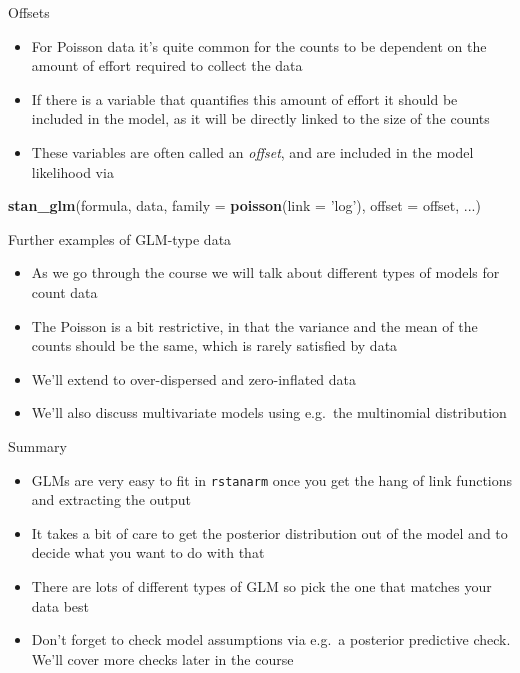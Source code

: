\documentclass[ignorenonframetext,]{beamer}
\newenvironment{Shaded}{\begin{snugshade}}{\end{snugshade}}
\newcommand{\KeywordTok}[1]{\textcolor[rgb]{0.13,0.29,0.53}{\textbf{#1}}}
\newcommand{\DataTypeTok}[1]{\textcolor[rgb]{0.13,0.29,0.53}{#1}}
\newcommand{\StringTok}[1]{\textcolor[rgb]{0.31,0.60,0.02}{#1}}
\newcommand{\NormalTok}[1]{#1}
\providecommand{\tightlist}{%
  \setlength{\itemsep}{0pt}\setlength{\parskip}{0pt}}
\begin{document}
\begin{frame}[fragile]{Offsets}

\begin{itemize}
\tightlist
\item
  For Poisson data it's quite common for the counts to be dependent on
  the amount of effort required to collect the data
\item
  If there is a variable that quantifies this amount of effort it should
  be included in the model, as it will be directly linked to the size of
  the counts
\item
  These variables are often called an \emph{offset}, and are included in
  the model likelihood via
\end{itemize}

\begin{Shaded}
\begin{Highlighting}[]
\KeywordTok{stan_glm}\NormalTok{(formula, data, }
         \DataTypeTok{family =} \KeywordTok{poisson}\NormalTok{(}\DataTypeTok{link =} \StringTok{'log'}\NormalTok{), }
         \DataTypeTok{offset =}\NormalTok{ offset, ...)}
\end{Highlighting}
\end{Shaded}

\end{frame}

\begin{frame}{Further examples of GLM-type data}

\begin{itemize}
\tightlist
\item
  As we go through the course we will talk about different types of
  models for count data
\item
  The Poisson is a bit restrictive, in that the variance and the mean of
  the counts should be the same, which is rarely satisfied by data
\item
  We'll extend to over-dispersed and zero-inflated data
\item
  We'll also discuss multivariate models using e.g.~the multinomial
  distribution
\end{itemize}

\end{frame}

\begin{frame}[fragile]{Summary}

\begin{itemize}
\tightlist
\item
  GLMs are very easy to fit in \texttt{rstanarm} once you get the hang
  of link functions and extracting the output
\item
  It takes a bit of care to get the posterior distribution out of the
  model and to decide what you want to do with that
\item
  There are lots of different types of GLM so pick the one that matches
  your data best
\item
  Don't forget to check model assumptions via e.g.~a posterior
  predictive check. We'll cover more checks later in the course
\end{itemize}

\end{frame}
\end{document}
